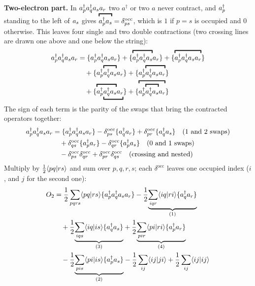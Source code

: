 \textbf{Two-electron part.} In $a^{\dagger}_{p} a^{\dagger}_{q} a_{s} a_{r}$ two $a^\dagger$ or two $a$ never contract, and $a^{\dagger}_{p}$ standing to the left of $a_{s}$ gives $\contraction{\cre{p} \ann{s}} = \delta^{\text{occ}}_{ps}$, which is $1$ if $p = s$ is occupied and $0$ otherwise. This leaves four single and two double contractions (two crossing lines are drawn one above and one below the string):
\begin{align*}
\cre{p} \cre{q} \ann{s} \ann{r} &= \no{\cre{p} \cre{q} \ann{s} \ann{r}} + \no{{\contraction{\cre{p} \cre{q} \ann{s}}} \ann{r}} + \no{\contraction{\cre{p} \cre{q} \ann{s} \ann{r}}} \\
&\quad + \no{\cre{p} {\contraction{\cre{q} \ann{s}}} \ann{r}} + \no{\cre{p} {\contraction{\cre{q} \ann{s} \ann{r}}}} \\
&\quad + \no{\mathrlap{\contraction{\phantom{\cre{p} \cre{q} \ann{s}}}} \cre{p} {\underbracket{\cre{q} \ann{s} \ann{r}}}} + \no{\contraction{\cre{p} {\contraction{\cre{q} \ann{s}}} \ann{r}}}
\end{align*}
The sign of each term is the parity of the swaps that bring the contracted operators together:
\begin{align*}
a^{\dagger}_{p} a^{\dagger}_{q} a_{s} a_{r} &= \{a^{\dagger}_{p} a^{\dagger}_{q} a_{s} a_{r}\} - \delta^{\text{occ}}_{ps} \{a^{\dagger}_{q} a_{r}\} + \delta^{\text{occ}}_{pr} \{a^{\dagger}_{q} a_{s}\} \quad\text{(1 and 2 swaps)} \\
&\quad + \delta^{\text{occ}}_{qs} \{a^{\dagger}_{p} a_{r}\} - \delta^{\text{occ}}_{qr} \{a^{\dagger}_{p} a_{s}\} \quad\text{(0 and 1 swaps)} \\
&\quad - \delta^{\text{occ}}_{ps} \delta^{\text{occ}}_{qr} + \delta^{\text{occ}}_{pr} \delta^{\text{occ}}_{qs} \quad\text{(crossing and nested)}
\end{align*}
Multiply by $\frac{1}{2} \langle pq\vert rs\rangle$ and sum over $p, q, r, s$; each $\delta^{\text{occ}}$ leaves one occupied index ($i$, and $j$ for the second one):
\begin{align*}
O_2 &= \frac{1}{2} \sum_{pqrs} \langle pq\vert rs\rangle \{a^{\dagger}_{p} a^{\dagger}_{q} a_{s} a_{r}\} - \frac{1}{2} {\underbrace{\sum_{iqr} \langle iq\vert ri\rangle \{a^{\dagger}_{q} a_{r}\}}_{(1)}} \\
&\quad + \frac{1}{2} {\underbrace{\sum_{iqs} \langle iq\vert is\rangle \{a^{\dagger}_{q} a_{s}\}}_{(3)}} + \frac{1}{2} {\underbrace{\sum_{pir} \langle pi\vert ri\rangle \{a^{\dagger}_{p} a_{r}\}}_{(4)}} \\
&\quad - \frac{1}{2} {\underbrace{\sum_{pis} \langle pi\vert is\rangle \{a^{\dagger}_{p} a_{s}\}}_{(2)}} - \frac{1}{2} \sum_{ij} \langle ij\vert ji\rangle + \frac{1}{2} \sum_{ij} \langle ij\vert ij\rangle
\end{align*}
